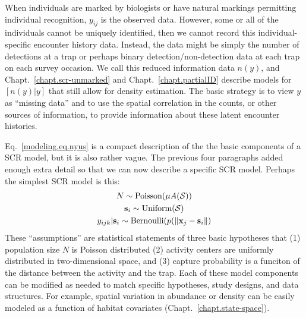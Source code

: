 When individuals are marked by biologists or have natural markings
permitting individual recognition, $y_{ij}$ is the observed
data. However, some or all of the individuals cannot be uniquely
identified, then we cannot record this individual-specific encounter
history data. Instead, the data might be simply the number of
detections at a trap or perhaps binary detection/non-detection data at
each trap on each survey occasion. We call this reduced information data $n(y)$, and
Chapt.~\ref{chapt.scr-unmarked} and Chapt.~\ref{chapt.partialID} describe
models for $[n(y)|y]$ that still allow for density estimation. The
basic strategy is to view $y$ as ``missing
data'' and to use the spatial correlation in the counts, or other
sources of information, to provide information about these latent
encounter histories.

Eq.~\ref{modeling.eq.nyus} is a compact description of the the basic components of a
SCR model, but it is also rather vague. The previous four paragraphs
added enough extra detail so that we can now describe a specific SCR
model. Perhaps the simplest SCR model is this:
\begin{gather}
N \sim \text{Poisson}(\mu A(\mathcal{S})) \nonumber \\
{\bf s}_{i} \sim \mbox{Uniform}({\cal S}) \label{modeling.eq.scr0} \\
y_{ijk} | {\bf s}_{i} \sim \mbox{Bernoulli}(p(\| {\bf x}_j - {\bf s}_{i} \|) \nonumber
\end{gather}
These ``assumptions'' are statistical statements of three basic hypotheses
that (1) population size $N$ is Poisson distributed
(2) activity centers are uniformly distributed in two-dimensional
space,
and (3) capture probability is a funciton of the distance
between the activity and the trap. Each of these model components can be
modified as needed to match specific hypotheses, study designs, and data
structures. For example, spatial variation in abundance or density can
be easily modeled as a function of habitat covariates
(Chapt.~\ref{chapt.state-space}). %

